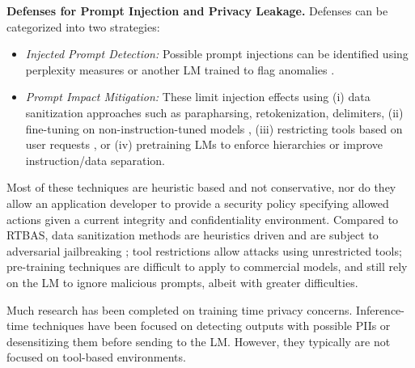 \textbf{Defenses for Prompt Injection and Privacy Leakage.} Defenses can be categorized into two strategies:
\begin{itemize}[noitemsep,topsep=0pt]
    \item \textit{Injected Prompt Detection:} Possible prompt injections can be identified using perplexity measures or another LM trained to flag anomalies \cite{protectAIdetector, rahman2024finetunedlargelanguagemodels,hung2024attentiontrackerdetectingprompt}.
    \item \textit{Prompt Impact Mitigation:} These limit injection effects using (i) data sanitization approaches such as parapharsing\cite{jain2023baselinedefensesadversarialattacks}, retokenization\cite{jain2023baselinedefensesadversarialattacks}, delimiters, (ii) fine-tuning on non-instruction-tuned models \cite{piet2024jatmopromptinjectiondefense}, (iii)
        restricting tools based on user requests \cite{debenedetti2024agentdojo}, or (iv)
        pretraining LMs to enforce hierarchies or improve instruction/data separation\cite{wallace2024instructionhierarchytrainingllms, chen2024struqdefendingpromptinjection}.
\end{itemize}

Most of these techniques are heuristic based and not conservative, nor do they allow an application developer to provide a security policy specifying allowed actions given a current integrity and confidentiality environment. Compared to RTBAS, data sanitization methods are heuristics driven and are subject to adversarial jailbreaking  \cite{liu2024autodangeneratingstealthyjailbreak}; tool restrictions allow attacks using unrestricted tools; pre-training techniques are difficult to apply to commercial models, and still rely on the LM to ignore malicious prompts, albeit with greater difficulties. 

Much research\cite{carlini2021extracting, kim2024propile} has been completed on training time privacy concerns. Inference-time techniques have been focused on detecting outputs with possible PIIs\cite{jiang2023migatingvulerabilities} or desensitizing them before sending to the LM\cite{firewallm,papillon}. However, they typically are not focused on tool-based environments.

